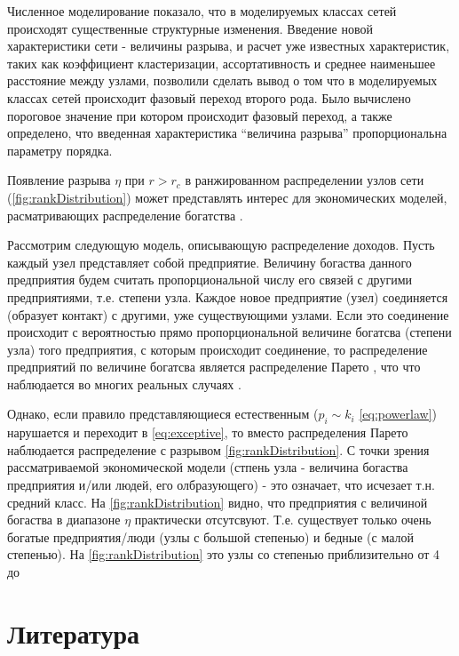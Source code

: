 \documentclass[10pt,aps,pra]{revtex4-1}
\begin{document}
    Численное моделирование показало, что в моделируемых классах сетей происходят существенные структурные изменения. Введение новой характеристики сети - величины разрыва, и расчет уже известных характеристик, таких как коэффициент кластеризации, ассортативность и среднее наименьшее расстояние между узлами, позволили сделать вывод о том что в моделируемых классах сетей происходит фазовый переход второго рода. Было вычислено пороговое значение при котором происходит фазовый переход, а также определено, что введенная характеристика ``величина разрыва'' пропорциональна параметру порядка.

    Появление разрыва $\eta$ при $r>r_c$ в ранжированном распределении узлов сети (\ref{fig:rankDistribution}) может представлять интерес для экономических моделей, расматривающих распределение богатства \cite{Economics2}.

    Рассмотрим следующую модель, описывающую распределение доходов. Пусть каждый узел представляет собой предприятие. Величину богаства данного предприятия будем считать пропорциональной числу его связей с другими предприятиями, т.е. степени узла. Каждое новое предприятие (узел) соединяется (образует контакт) с другими, уже существующими узлами. Если это соединение происходит с вероятностью прямо пропорциональной величине богатсва (степени узла) того предприятия, с которым происходит соединение, то распределение предприятий по величине богатсва является распределение Парето \cite{Economics2, Economics1}, что что наблюдается во многих реальных случаях \cite{Economics1}.

    Однако, если правило представляющиеся естественным ($p_i \sim k_i$ \ref{eq:powerlaw}) нарушается и переходит в \ref{eq:exceptive}, то вместо распределения Парето наблюдается распределение с разрывом \ref{fig:rankDistribution}. С точки зрения рассматриваемой экономической модели (стпень узла - величина богаства предприятия и/или людей, его олбразующего) - это означает, что исчезает т.н. средний класс. На \ref{fig:rankDistribution} видно, что предприятия с величиной богаства в диапазоне $\eta$ практически отсутсвуют. Т.е. существует только очень богатые предприятия/люди (узлы  с большой степенью) и бедные (с малой степенью). На \ref{fig:rankDistribution} это узлы со степенью приблизительно от 4 до 

\section{Литература}

 

\end{document}
